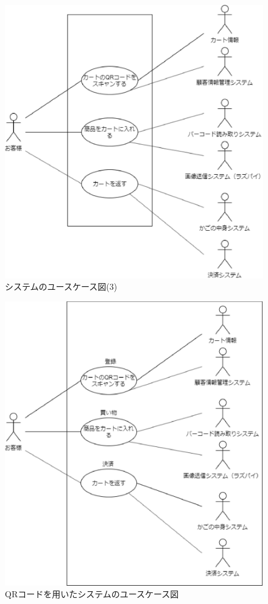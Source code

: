 \begin{figure}[htbp]
\centering
\includegraphics{./picture/usecase3.eps}
\caption{システムのユースケース図(3)}
\label{usecase3}
\end{figure}

\begin{figure}[htbp]
\centering
\includegraphics[width = 15cm]{./picture/usecase_qr.eps}
\caption{QRコードを用いたシステムのユースケース図}
\label{usecase_qr}
\end{figure}

